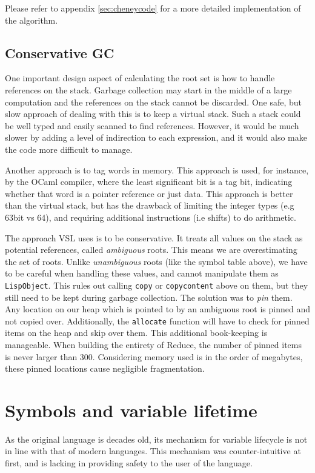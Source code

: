 Please refer to appendix \ref{sec:cheneycode} for a more detailed implementation of the algorithm.

\subsection{Conservative GC}
One important design aspect of calculating the root set is how to handle references on the stack. Garbage collection
may start in the middle of a large computation and the references on the stack cannot be discarded. One safe, but slow
approach of dealing with this is to keep a virtual stack. Such a stack could be well typed and easily scanned to find
references. However, it would be much slower by adding a level of indirection to each expression, and it would also make
the code more difficult to manage.

Another approach is to tag words in memory. This approach is used, for instance, by the OCaml compiler, where the least
significant bit is a tag bit, indicating whether that word is a pointer reference or just data. This approach is better
than the virtual stack, but has the drawback of limiting the integer types (e.g 63bit vs 64), and requiring additional
instructions (i.e shifts) to do arithmetic.

The approach VSL uses is to be conservative. It treats all values on the stack as potential references, called \emph{ambiguous} roots.
This means we are overestimating the set of roots. Unlike \emph{unambiguous} roots (like the symbol table above), we
have to be careful when handling these values, and cannot manipulate them as \texttt{LispObject}. This rules out calling
\texttt{copy} or \texttt{copycontent} above on them, but they still need to be kept during garbage collection. The solution was
to \emph{pin} them. Any location on our heap which is pointed to by an ambiguous root is pinned and not copied over.
Additionally, the \texttt{allocate} function will have to check for pinned items on the heap and skip over them. This
additional book-keeping is manageable. When building the entirety of Reduce, the number of pinned items is never
larger than 300. Considering memory used is in the order of megabytes, these pinned locations cause negligible
fragmentation.

\section{Symbols and variable lifetime}
As the original language is decades old, its mechanism for variable lifecycle is not in line with that of modern languages.
This mechanism was counter-intuitive at first, and is lacking in providing safety to the user of the language.

